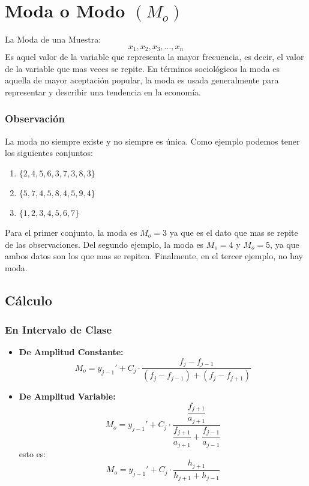 \section{Moda o Modo $(M_o)$}
La Moda de una Muestra:
$$x_1,x_2,x_3,\ldots,x_n$$
Es aquel valor de la variable que representa la mayor frecuencia, es decir, el valor de la variable que mas veces se repite. En términos sociológicos la moda es aquella de mayor aceptación popular, la moda es usada generalmente para representar y describir una tendencia en la economía.
\subsubsection{Observación}
La moda no siempre existe y no siempre es única.
Como ejemplo podemos tener los siguientes conjuntos:
\begin{enumerate}
\item $\{ 2,4,5,6,3,7,3,8,3\}$
\item $\{5,7,4,5,8,4,5,9,4\}$
\item $\{1,2,3,4,5,6,7\}$
\end{enumerate}
Para el primer conjunto, la moda es $M_o=3$ ya que es el dato que mas se repite de las observaciones. Del segundo ejemplo, la moda es $M_o=4$ y $M_o=5$, ya que ambos datos son los que mas se repiten. Finalmente, en el tercer ejemplo, no hay moda.
\subsection{Cálculo}
\subsubsection{En Intervalo de Clase}
\begin{itemize}
\item \textbf{De Amplitud Constante:}
$$M_o=y_{j-1}' + C_j\cdot\dfrac{f_j-f_{j-1}}{(f_j-f_{j-1})+(f_j-f_{j+1})}$$
\item \textbf{De Amplitud Variable:}
$$M_o=y_{j-1}' + C_j\cdot\dfrac{\dfrac{f_{j+1}}{a_{j+1}}}{\dfrac{f_{j+1}}{a_{j+1}}+\dfrac{f_{j-1}}{a_{j-1}}}$$
esto es:
$$M_o=y_{j-1}' + C_j\cdot\dfrac{h_{j+1}}{h_{j+1}+h_{j-1}}$$
\end{itemize}

